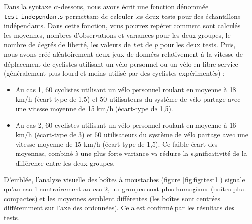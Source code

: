 \documentclass[
  11pt,
  french,
]{book}
\begin{document}
Dans la syntaxe ci-dessous, nous avons écrit une fonction dénommée \texttt{test\_independants} permettant de calculer les deux tests pour des échantillons indépendants. Dans cette fonction, vous pourrez repérer comment sont calculés les moyennes, nombres d'observations et variances pour les deux groupes, le nombre de degrés de liberté, les valeurs de \emph{t} et de \emph{p} pour les deux tests. Puis, nous avons créé aléatoirement deux jeux de données relativement à la vitesse de déplacement de cyclistes utilisant un vélo personnel ou un vélo en libre service (généralement plus lourd et moins utilisé par des cyclistes expérimentés) :

\begin{itemize}
\item
  Au cas 1, 60 cyclistes utilisant un vélo personnel roulant en moyenne à 18 km/h (écart-type de 1,5) et 50 utilisateurs du système de vélo partage avec une vitesse moyenne de 15 km/h (écart-type de 1,5).
\item
  Au cas 2, 60 cyclistes utilisant un vélo personnel roulant en moyenne à 16 km/h (écart-type de 3) et 50 utilisateurs du système de vélo partage avec une vitesse moyenne de 15 km/h (écart-type de 1,5). Ce faible écart des moyennes, combiné à une plus forte variance va réduire la significativité de la différence entre les deux groupes.
\end{itemize}

D'emblée, l'analyse visuelle des boîtes à moustaches (figure \ref{fig:figttest1}) signale qu'au cas 1 contrairement au cas 2, les groupes sont plus homogènes (boîtes plus compactes) et les moyennes semblent différentes (les boîtes sont centrées différemment sur l'axe des ordonnées). Cela est confirmé par les résultats des tests.
\end{document}
